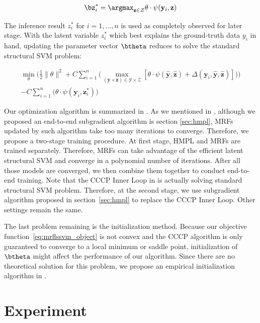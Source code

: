 \documentclass[sigconf]{acmart}
\renewcommand{\cite}{\citep}
\begin{document}
\begin{align}
  \bz_i^*=\argmax_{\mathbf{z} \in \mathcal{Z}} \theta \cdot
  \psi(\mathbf{y}_i,\mathbf{z})
\end{align}

The inference result $z_i^*$ for $i=1,\dots,n$ is used as
completely observed for later stage. With the latent variable
$z_i^*$ which best explains the ground-truth data $y_i$ in hand,
updating the parameter vector $\btheta$ reduces to solve the
standard structural SVM problem:

\begin{align}
\label{eq:mrflssvm_object}
  \min_\theta\bigg(\frac{1}{2}\|\theta\|^2+
  C\sum_{i=1}^{n}\big(\max_{(\mathbf{\hat{y}} \times
  \mathbf{\hat{z}}) \in \mathcal{Y} \times \mathcal{Z}}
  [\theta\cdot\psi(\mathbf{\hat{y}},\mathbf{\hat{z}}) +
  \Delta(\mathbf{y}_i,\mathbf{\hat{y}},\mathbf{\hat{z}})]\big)\bigg)\\
  -C\sum_{i=1}^{n}\big(\theta \cdot
  \psi(\mathbf{y}_i,\mathbf{z}_i^*)\big) \nonumber
\end{align}

Our optimization algorithm is summarized in
. As we mentioned in , 
although we proposed an end-to-end
subgradient algorithm is section \ref{sec:hmpl}, MRFs updated by
such algorithm take too many iterations to converge. Therefore,
we propose a two-stage training procedure. At first stage, HMPL
and MRFs are trained separately. Therefore, MRFs can take
advantage of the efficient latent structural SVM and converge in
a polynomial number of iterations. After all those models are
converged, we then combine them together to conduct end-to-end
training. Note that the CCCP Inner Loop in 
is actually solving standard structural SVM problem. Therefore,
at the second stage, we use subgradient algorithm proposed in
section~\ref{sec:hmpl} to replace the CCCP Inner Loop. Other
settings remain the same.

The last problem remaining is the initialization method. Because
our objective function~\eqref{eq:mrflssvm_object} is not convex
and the CCCP algorithm is only guaranteed to converge to a local
minimum or saddle point\cite{yuille2002concave}, initialization
of $\btheta$ might affect the performance of our algorithm. Since
there are no theoretical solution for this problem, we propose an
empirical initialization algorithm in .

\section{Experiment}
\label{sec:exp}
\end{document}
